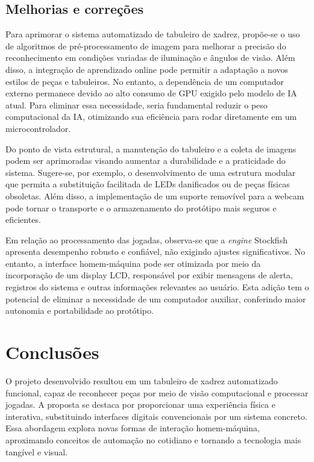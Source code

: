 \documentclass[journal]{IEEEtran} %
\begin{document}
\subsection{Melhorias e correções}

Para aprimorar o sistema automatizado de tabuleiro de xadrez, propõe-se o uso de algoritmos de pré-processamento de imagem para melhorar a precisão do reconhecimento em condições variadas de iluminação e ângulos de visão. Além disso, a integração de aprendizado online pode permitir a adaptação a novos estilos de peças e tabuleiros. No entanto, a dependência de um computador externo permanece devido ao alto consumo de GPU exigido pelo modelo de IA atual. Para eliminar essa necessidade, seria fundamental reduzir o peso computacional da IA, otimizando sua eficiência para rodar diretamente em um microcontrolador.

Do ponto de vista estrutural, a manutenção do tabuleiro e a coleta de imagens podem ser aprimoradas visando aumentar a durabilidade e a praticidade do sistema. Sugere-se, por exemplo, o desenvolvimento de uma estrutura modular que permita a substituição facilitada de LEDs danificados ou de peças físicas obsoletas. Além disso, a implementação de um suporte removível para a webcam pode tornar o transporte e o armazenamento do protótipo mais seguros e eficientes.

Em relação ao processamento das jogadas, observa-se que a \textit{engine} Stockfish apresenta desempenho robusto e confiável, não exigindo ajustes significativos. No entanto, a interface homem-máquina pode ser otimizada por meio da incorporação de um display LCD, responsável por exibir mensagens de alerta, registros do sistema e outras informações relevantes ao usuário. Esta adição tem o potencial de eliminar a necessidade de um computador auxiliar, conferindo maior autonomia e portabilidade ao protótipo.

\section{Conclusões}

O projeto desenvolvido resultou em um tabuleiro de xadrez automatizado funcional, capaz de reconhecer peças por meio de visão computacional e processar jogadas. A proposta se destaca por proporcionar uma experiência física e interativa, substituindo interfaces digitais convencionais por um sistema concreto. Essa abordagem explora novas formas de interação homem-máquina, aproximando conceitos de automação no cotidiano e tornando a tecnologia mais tangível e visual.
\end{document}
